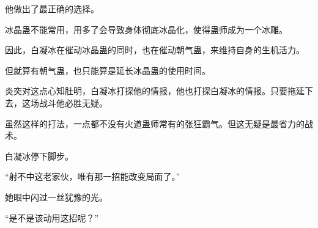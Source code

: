 \begin{this_body}
他做出了最正确的选择。

冰晶蛊不能常用，用多了会导致身体彻底冰晶化，使得蛊师成为一个冰雕。

因此，白凝冰在催动冰晶蛊的同时，也在催动朝气蛊，来维持自身的生机活力。

但就算有朝气蛊，也只能算是延长冰晶蛊的使用时间。

炎突对这点心知肚明，白凝冰打探他的情报，他也打探白凝冰的情报。只要拖延下去，这场战斗他必胜无疑。

虽然这样的打法，一点都不没有火道蛊师常有的张狂霸气。但这无疑是最省力的战术。

白凝冰停下脚步。

“射不中这老家伙，唯有那一招能改变局面了。”

她眼中闪过一丝犹豫的光。

“是不是该动用这招呢？”

\end{this_body}

